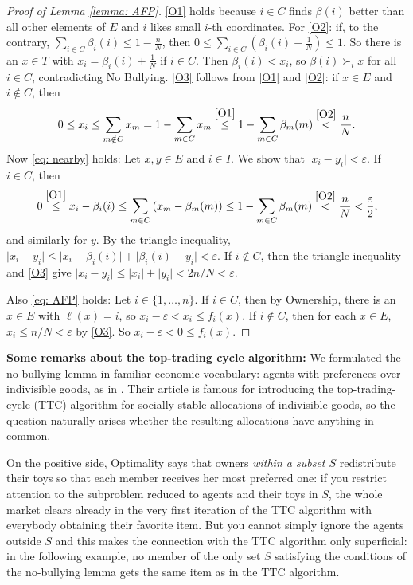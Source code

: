 \documentclass[english, 11pt]{article}
\theoremstyle{plain} %
\theoremstyle{definition}
\begin{document}
\begin{proof}[Proof of Lemma \ref{lemma: AFP}]
\ref{O1} holds because $i \in C$ finds $\beta(i)$ better than all other elements of $E$ and $i$ likes small $i$-th coordinates. For \ref{O2}: if, to the contrary, $\sum_{i \in C} \beta_i(i) \leq 1 - \frac{n}{N}$, then $0 \leq \sum_{i \in C} \left(\beta_i(i) + \frac{1}{N} \right) \leq 1$. So there is an $x \in T$ with $x_i = \beta_i(i) + \frac{1}{N}$ if $i \in C$. Then $\beta_i(i) < x_i$, so $\beta(i) \succ_i x$ for all $i \in C$, contradicting No Bullying. \ref{O3} follows from \ref{O1} and \ref{O2}: if $x \in E$ and $i \notin C$, then
\[
0 \leq x_i \leq \sum_{m \notin C} x_m = 1 - \sum_{m \in C} x_m \stackrel{\scriptstyle \ref{O1}}{\leq} 1 - \sum_{m  \in C} \beta_m(m) \stackrel{\scriptstyle \ref{O2}}{<} \frac{n}{N}.
\]
Now \eqref{eq: nearby} holds: Let $x, y \in E$ and $i \in I$. We show that $\lvert x_i - y_i \rvert < \varepsilon$. If $i \in C$, then
\[
0 \stackrel{\scriptstyle \ref{O1}}{\leq} x_i - \beta_i(i) \leq \sum_{m \in C} \left( x_m - \beta_m(m) \right) \leq 1 - \sum_{m \in C} \beta_m(m) \stackrel{\scriptstyle \ref{O2}}{<} \frac{n}{N} < \frac{\varepsilon}{2},
\]
and similarly for $y$. By the triangle inequality, $\lvert x_i - y_i \rvert \leq \lvert x_i - \beta_i(i) \rvert + \lvert \beta_i(i) - y_i \rvert < \varepsilon$. If $i \notin C$, then the triangle inequality and \ref{O3} give $\lvert x_i - y_i \rvert \leq \lvert x_i \rvert + \lvert y_i \rvert < 2n/N < \varepsilon$.

Also \eqref{eq: AFP} holds: Let $i \in \{1, \ldots, n\}$. If $i \in C$, then by Ownership, there is an $x \in E$ with $\ell(x) = i$, so $x_i - \varepsilon < x_i \leq f_i(x)$. If $i \notin C$, then for each $x \in E$, $x_i \leq n/N < \varepsilon$ by \ref{O3}. So $x_i - \varepsilon < 0 \leq f_i(x)$.
\end{proof}

\medskip
\noindent \textbf{Some remarks about the top-trading cycle algorithm:} We formulated the no-bullying lemma in familiar economic vocabulary: agents with preferences over indivisible goods, as in \citet{ShapleyScarf1974}. Their article is famous for introducing the top-trading-cycle (TTC) algorithm for socially stable allocations of indivisible goods, so the question naturally arises whether the resulting allocations have anything in common.

On the positive side, Optimality says that owners \emph{within a subset $S$\/} redistribute their toys so that each member receives her most preferred one: if you restrict attention to the subproblem reduced to agents and their toys in $S$, the whole market clears already in the very first iteration of the TTC algorithm with everybody obtaining their favorite item. But you cannot simply ignore the agents outside $S$ and this makes the connection with the TTC algorithm only superficial: in the following example, no member of the only set $S$ satisfying the conditions of the no-bullying lemma gets the same item as in the TTC algorithm.
\end{document}
